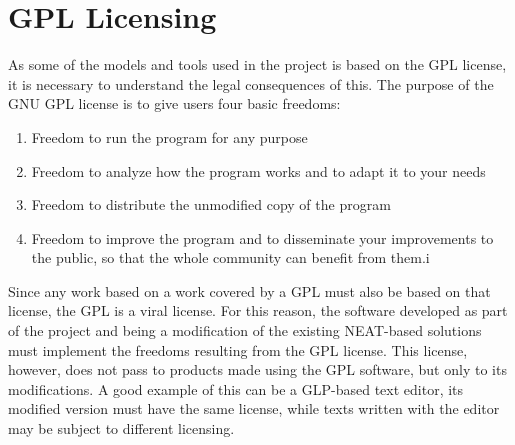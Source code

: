 \FloatBarrier
\section{GPL Licensing}
As some of the models and tools used in the project is based on the GPL license, it is necessary 
to understand the legal consequences of this. 
The purpose of the GNU GPL license is to give users four basic freedoms: 
\begin{enumerate}
\item Freedom to run the program for any purpose 
\item Freedom to analyze how the program works and to adapt it to your needs 
\item Freedom to distribute the unmodified copy of the program 
\item Freedom to improve the program and to disseminate your improvements to the public, so that 
	the whole community can benefit from them.i
\end{enumerate}
Since any work based on a work covered by a GPL must also be based on that license, the GPL 
is a viral license. 
For this reason, the software developed as part of the project and being a modification of the 
existing NEAT-based solutions must implement the freedoms resulting from the GPL license. 
This license, however, does not pass to products made using the GPL software, but only to its 
modifications. 
A good example of this can be a GLP-based text editor, its modified version must have the same 
license, while texts written with the editor may be subject to different licensing.
